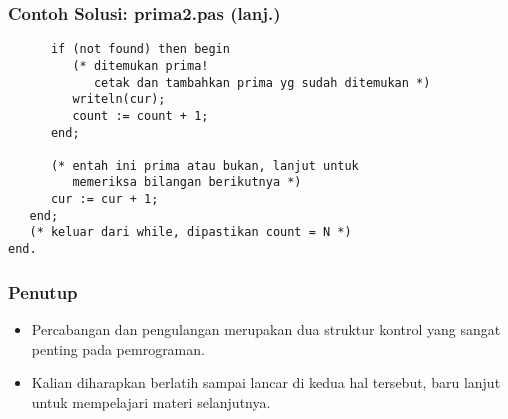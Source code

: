 \documentclass{beamer}
\begin{document}
\begin{frame}[fragile]
\frametitle{Contoh Solusi: prima2.pas (lanj.)}
\begin{lstlisting}
      if (not found) then begin
         (* ditemukan prima! 
            cetak dan tambahkan prima yg sudah ditemukan *)
         writeln(cur);
         count := count + 1;
      end;

      (* entah ini prima atau bukan, lanjut untuk 
         memeriksa bilangan berikutnya *)
      cur := cur + 1;
   end;
   (* keluar dari while, dipastikan count = N *)
end.
\end{lstlisting}
\end{frame}

\begin{frame}
\frametitle{Penutup}
\begin{itemize}
	\item Percabangan dan pengulangan merupakan dua struktur kontrol yang sangat penting pada pemrograman.
	\item Kalian diharapkan berlatih sampai lancar di kedua hal tersebut, baru lanjut untuk mempelajari materi selanjutnya.
\end{itemize}
\end{frame}
\end{document}
